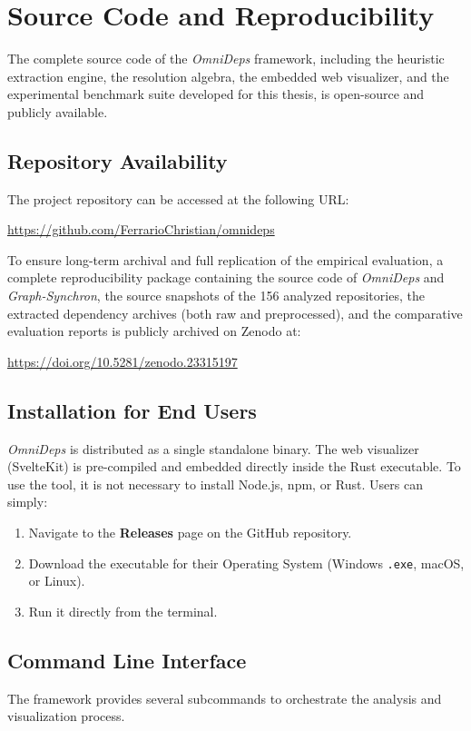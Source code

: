 \chapter{Source Code and Reproducibility}
\label{app:reproducibility}

The complete source code of the \textit{OmniDeps} framework,
including the heuristic extraction engine, the resolution algebra,
the embedded web visualizer, and the experimental benchmark suite
developed for this thesis, is open-source and publicly available.

\section{Repository Availability}
The project repository can be accessed at the following URL:
\begin{center}
  \url{https://github.com/FerrarioChristian/omnideps}
\end{center}
To ensure long-term archival and full replication of the empirical
evaluation, a complete reproducibility package containing the source
code of \textit{OmniDeps} and \textit{Graph-Synchron}, the source
snapshots of the 156 analyzed repositories, the extracted dependency
archives (both raw and preprocessed), and the comparative evaluation
reports is publicly archived on Zenodo at:
\begin{center}
  \url{https://doi.org/10.5281/zenodo.23315197}
\end{center}

\section{Installation for End Users}
\textit{OmniDeps} is distributed as a single standalone binary. The
web visualizer (SvelteKit) is pre-compiled and embedded directly
inside the Rust executable. To use the tool, it is not necessary to
install Node.js, npm, or Rust.
Users can simply:
\begin{enumerate}
  \item Navigate to the \textbf{Releases} page on the GitHub repository.
  \item Download the executable for their Operating System (Windows
    \texttt{.exe}, macOS, or Linux).
  \item Run it directly from the terminal.
\end{enumerate}

\section{Command Line Interface}
The framework provides several subcommands to orchestrate the
analysis and visualization process.

